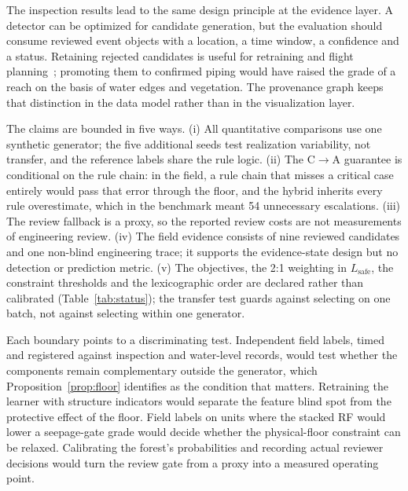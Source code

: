 \documentclass[journal]{IEEEtran}
\newcommand{\CtoA}{C$\rightarrow$A}
\newcommand{\Lsafe}{L_{\mathrm{safe}}}
\begin{document}
The inspection results lead to the same design principle at the evidence layer. A detector can be optimized for candidate generation, but the evaluation should consume reviewed event objects with a location, a time window, a confidence and a status. Retaining rejected candidates is useful for retraining and flight planning~\cite{Kumar2025}; promoting them to confirmed piping would have raised the grade of a reach on the basis of water edges and vegetation. The provenance graph keeps that distinction in the data model rather than in the visualization layer.

The claims are bounded in five ways. (i) All quantitative comparisons use one synthetic generator; the five additional seeds test realization variability, not transfer, and the reference labels share the rule logic. (ii) The \CtoA{} guarantee is conditional on the rule chain: in the field, a rule chain that misses a critical case entirely would pass that error through the floor, and the hybrid inherits every rule overestimate, which in the benchmark meant 54 unnecessary escalations. (iii) The review fallback is a proxy, so the reported review costs are not measurements of engineering review. (iv) The field evidence consists of nine reviewed candidates and one non-blind engineering trace; it supports the evidence-state design but no detection or prediction metric. (v) The objectives, the 2:1 weighting in $\Lsafe$, the constraint thresholds and the lexicographic order are declared rather than calibrated (Table~\ref{tab:status}); the transfer test guards against selecting on one batch, not against selecting within one generator.

Each boundary points to a discriminating test. Independent field labels, timed and registered against inspection and water-level records, would test whether the components remain complementary outside the generator, which Proposition~\ref{prop:floor} identifies as the condition that matters. Retraining the learner with structure indicators would separate the feature blind spot from the protective effect of the floor. Field labels on units where the stacked RF would lower a seepage-gate grade would decide whether the physical-floor constraint can be relaxed. Calibrating the forest's probabilities and recording actual reviewer decisions would turn the review gate from a proxy into a measured operating point.
\end{document}
